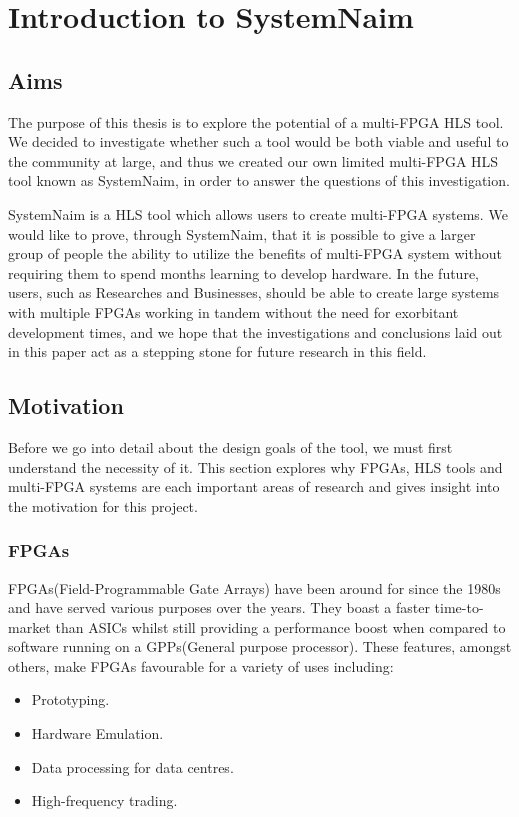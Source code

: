 \chapter{Introduction to SystemNaim}
\label{sec:intro}

\section{Aims}

The purpose of this thesis is to explore the potential of a multi-FPGA HLS tool. We decided to investigate whether such a tool would be both viable and useful to the community at large, and thus we created our own limited multi-FPGA HLS tool known as SystemNaim, in order to answer the questions of this investigation.

SystemNaim is a HLS tool which allows users to create multi-FPGA systems. We would like to prove, through SystemNaim, that it is possible to give a larger group of people the ability to utilize the benefits of multi-FPGA system without requiring them to spend months learning to develop hardware. In the future, users, such as Researches and Businesses, should be able to create large systems with multiple FPGAs working in tandem without the need for exorbitant development times, and we hope that the investigations and conclusions laid out in this paper act as a stepping stone for future research in this field.

\section{Motivation}

Before we go into detail about the design goals of the tool, we must first understand the necessity of it. This section explores why FPGAs, HLS tools and multi-FPGA systems are each important areas of research and gives insight into the motivation for this project.

\subsection{FPGAs}

FPGAs(Field-Programmable Gate Arrays) have been around for since the 1980s and have served various purposes over the years\cite{fpga-history}. They boast a faster time-to-market than ASICs whilst still providing a performance boost when compared to software running on a GPPs(General purpose processor). These features, amongst others, make FPGAs favourable for a variety of uses including:
\begin{itemize}
    \item Prototyping.
    \item Hardware Emulation.
    \item Data processing for data centres.
    \item High-frequency trading.
 \end{itemize}

